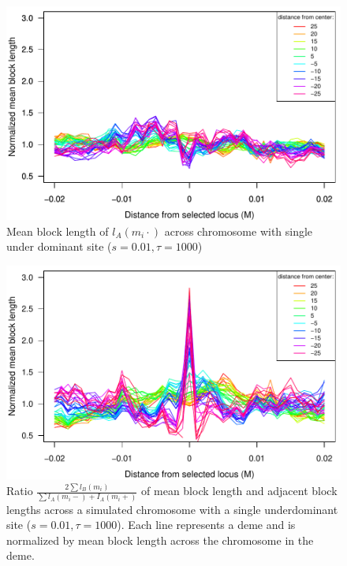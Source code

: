 \documentclass[12pt,titlepage]{article}
\begin{document}
\begin{figure}
\includegraphics{figs/adjacentBlocksAlongChromAncBConditioning}
\caption{Mean block length of $l_A(m_i\cdot)$ across chromosome with single under dominant site ($s=0.01, \tau=1000$)}\label{Supp:adjacentBlocks}
\end{figure}


\begin{figure}
\includegraphics{figs/ratioAdjacentBlocksAlongChromAncBConditioning}
\caption{Ratio $\frac{2\sum{l_B(m_i)}}{\sum{l_A(m_i-)+I_A(m_i+)}}$ of mean block length and adjacent block lengths across a simulated chromosome with a single underdominant site ($s=0.01, \tau=1000$).  Each line represents a deme and is normalized by mean block length across the chromosome in the deme.}\label{Supp:ratioBlockAdjacent}
\end{figure}
\end{document}
